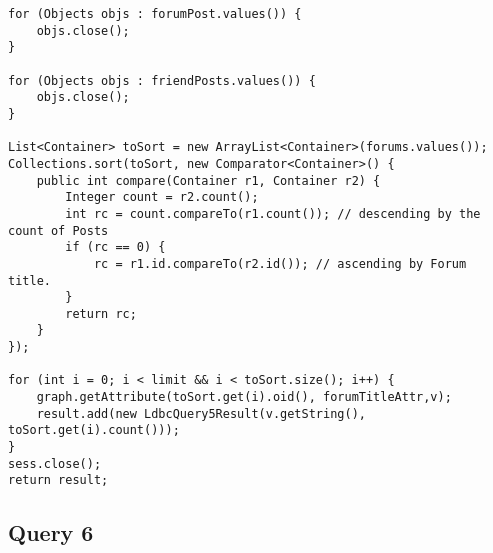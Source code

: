 {\begin{verbatim}
for (Objects objs : forumPost.values()) {
    objs.close();
}

for (Objects objs : friendPosts.values()) {
    objs.close();
}

List<Container> toSort = new ArrayList<Container>(forums.values());
Collections.sort(toSort, new Comparator<Container>() {
    public int compare(Container r1, Container r2) {
        Integer count = r2.count();
        int rc = count.compareTo(r1.count()); // descending by the count of Posts
        if (rc == 0) {
            rc = r1.id.compareTo(r2.id()); // ascending by Forum title.
        }
        return rc;
    }
});

for (int i = 0; i < limit && i < toSort.size(); i++) {
    graph.getAttribute(toSort.get(i).oid(), forumTitleAttr,v);
    result.add(new LdbcQuery5Result(v.getString(), toSort.get(i).count()));
}
sess.close();
return result;
\end{verbatim}
}

\subsection{Query 6}

